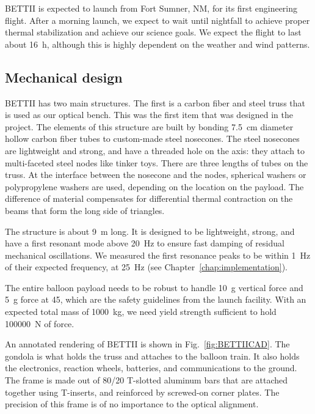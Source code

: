 BETTII is expected to launch from Fort Sumner, NM, for its first engineering flight. After a morning launch, we expect to wait until nightfall to achieve proper thermal stabilization and achieve our science goals. We expect the flight to last about \SI{16}{\hour}, although this is highly dependent on the weather and wind patterns.


\subsection{Mechanical design}

BETTII has two main structures. The first is a carbon fiber and steel truss that is used as our optical bench. This was the first item that was designed in the project. The elements of this structure are built by bonding \SI{7.5}{\centi\meter} diameter hollow carbon fiber tubes to custom-made steel nosecones. The steel nosecones are lightweight and strong, and have a threaded hole on the axis: they attach to multi-faceted steel nodes like tinker toys. There are three lengths of tubes on the truss. At the interface between the nosecone and the nodes, spherical washers or polypropylene washers are used, depending on the location on the payload. The difference of material compensates for differential thermal contraction on the beams that form the long side of triangles.

The structure is about \SI{9}{\meter} long. It is designed to be lightweight, strong, and have a first resonant mode above \SI{20}{\hertz} to ensure fast damping of residual mechanical oscillations. We measured the first resonance peaks to be within \SI{1}{\hertz} of their expected frequency, at \SI{25}{\hertz} (see Chapter~\ref{chap:implementation}).

The entire balloon payload needs to be robust to handle 10~g vertical force and 5~g force at \SI{45}{\deg}, which are the safety guidelines from the launch facility. With an expected total mass of \SI{1000}{\kilo\gram}, we need yield strength sufficient to hold \SI{100000}{\newton} of force. 

An annotated rendering of BETTII is shown in Fig.~\ref{fig:BETTIICAD}. The gondola is what holds the truss and attaches to the balloon train. It also holds the electronics, reaction wheels, batteries, and communications to the ground. The frame is made out of 80/20 T-slotted aluminum bars that are attached together using T-inserts, and reinforced by screwed-on corner plates. The precision of this frame is of no importance to the optical alignment. 


